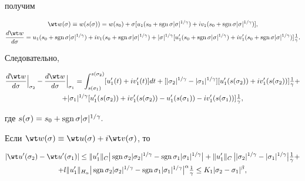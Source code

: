 получим


\begin{gather*}


\wt w (\sigma) \equiv w(s(\sigma)) = w(s_0) + \sigma


[u_1(s_0 + \sgn \sigma|\sigma|^{1/\gamma}) + iv_1(s_0 +


\sgn \sigma|\sigma|^{1/\gamma})],\\


%


\frac{d \wt w}{d{\sigma}} =


u_1(s_0 + \sgn \sigma|\sigma|^{1/\gamma}) +


iv_1(s_0 + \sgn \sigma|\sigma|^{1/\gamma}) +


|\sigma|^{1/\gamma} [u_1'(s_0+ \sgn


\sigma|\sigma|^{1/\gamma}) +


iv_1'(s_0+ \sgn \sigma|\sigma|^{1/\gamma})]\tfrac{1}{\gamma}.


\end{gather*}


Следовательно,


\begin{multline*}


\frac{d\wt w}{d\sigma}\Big|_{\sigma_2} - \frac{d\wt w}


{d\sigma}\Big|_{\sigma_1} = \int_{s(\sigma_1)}^{s(\sigma_2)}


[u_1'(t) + iv_1'(t)]dt + [|\sigma_2|^{1/\gamma} -


|\sigma_1|^{1/\gamma}][u_1'(s(\sigma_2)) +


iv_1'(s(\sigma_2))]\tfrac{1}{\gamma} + \\


%


+|\sigma_1|^{1/\gamma}[u_1'(s(\sigma_2)) +


iv_1'(s(\sigma_2))-u_1'(s(\sigma_1))-iv_1'(s(\sigma_1))]\tfrac{1}{\gamma},


\end{multline*}


где $s(\sigma) = s_0 + \operatorname{sgn} \sigma|\sigma|^{1/\gamma}.$


Если $\wt w(\sigma) \equiv \wt u(\sigma) + i\wt v(\sigma)$, то


\begin{multline*}


|\wt u'(\sigma_2) - \wt u'(\sigma_1)| \leq \|u_1'\|_{C}


\big|\sgn \sigma_2 |\sigma_2|^{1/\gamma} - \sgn \sigma_1


|\sigma_1|^{1/\gamma}\big| + \|u_1'\|_{C}\, \big||\sigma_2|^


{1/\gamma} - |\sigma_1|^{1/\gamma}\big|\tfrac{1}{\gamma} +\\


%


+ l\|u_1'\|_{H_{\alpha}}\big|\sgn \sigma_2|


\sigma_2|^{1/\gamma} - \sgn \sigma_1


|\sigma_1|^{1/\gamma}\big|^{\alpha}\tfrac{1}{\gamma} \leq


K_1 |\sigma_2 - \sigma_1|^{\beta},


\end{multline*}


